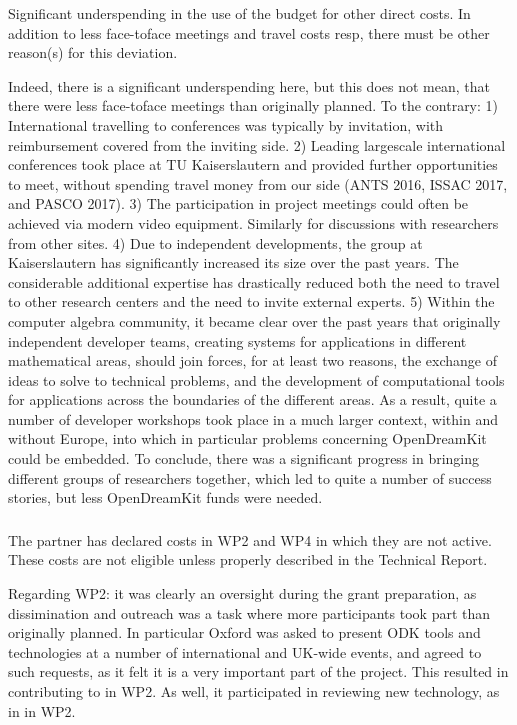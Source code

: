 \begin{EUcomment}
\begin{EUcomment}
  Significant underspending in the use of the budget for other direct
  costs. In addition to less face-toface meetings and travel costs
  resp, there must be other reason(s) for this deviation.
\end{EUcomment}
Indeed, there is a significant underspending here, but this does not mean, that there were less face-toface
meetings than originally planned. To the contrary: 1) International travelling to conferences was typically 
by invitation, with reimbursement covered from the inviting side. 2) Leading largescale international conferences 
took place at TU Kaiserslautern and provided further opportunities to meet, without spending travel money from our 
side (ANTS 2016, ISSAC 2017, and PASCO 2017). 3) The participation in project meetings could often be achieved 
via modern video equipment. Similarly for discussions with researchers from other sites. 4) Due to independent 
developments, the group at Kaiserslautern has significantly increased its size over the past years. 
The considerable additional expertise has drastically reduced both the need to travel to other research centers 
and the need to invite external experts. 5) Within the computer algebra community, it became clear over the past 
years that originally independent developer teams, creating systems for applications in different mathematical 
areas, should join forces, for at least two reasons, the exchange of ideas to solve to  technical problems, and
the development of computational tools for applications across the boundaries of the different areas. As a result, 
quite a number of developer workshops took place in a much larger context, within and without Europe, into 
which in particular problems concerning OpenDreamKit could be embedded. To conclude, there was a significant 
progress in bringing different groups of researchers together, which led to quite a number of success stories, 
but less OpenDreamKit funds were needed.

\subsubsection{}
\begin{EUcomment}
  The partner has declared costs in WP2 and WP4 in which they are not
  active. These costs are not eligible unless properly described in
  the Technical Report.
\end{EUcomment}
Regarding WP2: it was clearly an oversight during the grant preparation, as dissimination and 
outreach was a task where more participants took part than originally planned. In particular Oxford 
was asked to present ODK tools and technologies at a number of international and UK-wide events,
and agreed to such requests, as it felt it is a very important part of the project. This resulted 
in contributing to  in WP2. As well, it participated in reviewing
new technology, as in  in WP2.


\end{EUcomment}

